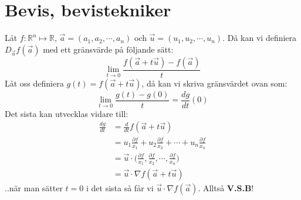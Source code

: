 \documentclass{report}
\begin{document}
\pagebreak

\chapter{Bevis, bevistekniker}
{
	Låt $f : \mathbb{R}^n \mapsto \mathbb{R}$, $\vec{a} = (a_1, a_2, \cdots, a_n)$ och $\vec{u} = (u_1, u_2, \cdots, u_n)$. Då kan vi definiera $D_{\vec{u}}f(\vec{a})$ med ett gränsvärde på följande sätt:
	\begin{equation*}
		\lim_{t \to 0} \frac{ f(\vec{a} + t\vec{u})-f(\vec{a})}{t}
	\end{equation*}
	Låt oss definiera $g(t) = f(\vec{a} + t\vec{u})$, då kan vi skriva gränsvärdet ovan som:
	\begin{equation*}
		\lim_{t \to 0} \frac{g(t)-g(0)}{t} = \frac{dg}{dt}(0)
	\end{equation*}
	Det sista kan utvecklas vidare till:
	\begin{align*}
		\frac{dg}{dt} &= \frac{d}{dt}f(\vec{a} + t\vec{u})\\
			      &= u_1 \frac{\partial f}{x_1} + u_2 \frac{\partial f}{x_2} + \cdots + u_n \frac{\partial f}{x_n}\\
			      &= \vec{u} \cdot \bigl( \frac{\partial f}{x_1}, \frac{\partial f}{x_2}, \cdots, \frac{\partial f}{x_n} \bigr)\\
			      &= \vec{u} \cdot \nabla f(\vec{a} + t\vec{u})
	\end{align*}
	..när man sätter $ t = 0$ i det sista så får vi $\vec{u} \cdot \nabla f(\vec{a})$. Alltså \textbf{V.S.B}!
}
\end{document}
